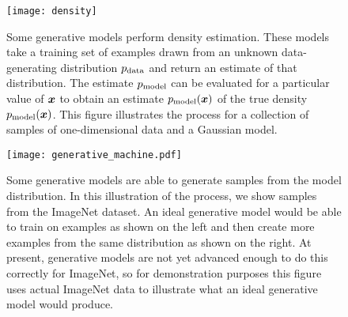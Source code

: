 \begin{figure}
\center
\texttt{[image: density]}
\caption{Some generative models perform density estimation.
These models take a training set of examples drawn from an unknown
data-generating distribution $p_{\rm{data}}$ and return an estimate of that
distribution. The estimate $p_{\rm{model}}$ can be evaluated for a particular
value of ${\bm{x}}$ to obtain an estimate $p_{\rm{model}}({\bm{x}})$ of the true
density $p_{\rm{model}}({\bm{x}})$.
This figure illustrates the process for a collection of samples of
one-dimensional data and a Gaussian model.
}
\label{fig:density}
\end{figure}

\begin{figure}
  \center
  \texttt{[image: generative\_machine.pdf]}
  \caption{Some generative models are able to generate samples
    from the model distribution.
    In this illustration of the process, we show samples from
    the ImageNet \citep{imagenet_cvpr09,Deng2010,ILSVRCarxiv14} 
    dataset.
    An ideal generative model would be able to train on examples
    as shown on the left and then create more examples from the
    same distribution as shown on the right.
    At present, generative models are not yet advanced enough to
    do this correctly for ImageNet, so for demonstration purposes
    this figure uses actual ImageNet data to illustrate what an
    ideal generative model would produce.
  }
  \label{fig:generative_machine}
\end{figure}

